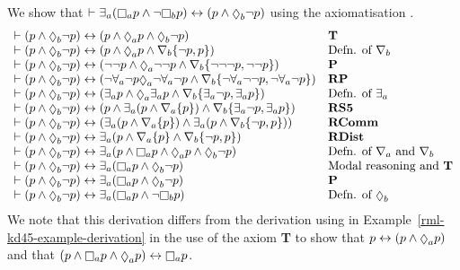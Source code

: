 \begin{example}\label{rml-s5-example-derivation}
We show that $\proves \somerefsA (\necessaryA \atomP \land \lnot \necessaryB \atomP) \iff (\atomP \land \possibleB \lnot \atomP)$ using the axiomatisation \axiomRmlS{}.
$$
\begin{array}{ll}
    \proves (\atomP \land \possibleB \lnot \atomP) \iff (\atomP \land \possibleA \atomP \land \possibleB \lnot \atomP) & {\bf T}\\
    \proves (\atomP \land \possibleB \lnot \atomP) \iff (\atomP \land \possibleA \atomP \land \coversB \{\lnot \atomP, \atomP\}) & \text{Defn. of $\coversB$}\\
    \proves (\atomP \land \possibleB \lnot \atomP) \iff (\lnot \lnot \atomP \land \possibleA \lnot \lnot \atomP \land \coversB \{\lnot \lnot \lnot \atomP, \lnot \lnot \atomP\}) & {\bf P}\\
    \proves (\atomP \land \possibleB \lnot \atomP) \iff (\lnot \allrefsA \lnot \atomP \possibleA \lnot \allrefsA \lnot \atomP \land \coversB \{\lnot \allrefsA \lnot \lnot \atomP, \lnot \allrefsA \lnot \atomP\}) & {\bf RP}\\
    \proves (\atomP \land \possibleB \lnot \atomP) \iff (\somerefsA \atomP \land \possibleA \somerefsA \atomP \land \coversB \{\somerefsA \lnot \atomP, \somerefsA \atomP\}) & \text{Defn. of $\somerefsA$}\\
    \proves (\atomP \land \possibleB \lnot \atomP) \iff (\atomP \land \somerefsA (\atomP \land \coversA \{\atomP\}) \land \coversB \{\somerefsA \lnot \atomP, \somerefsA \atomP\}) & {\bf RS5}\\
    \proves (\atomP \land \possibleB \lnot \atomP) \iff (\somerefsA (\atomP \land \coversA \{\atomP\}) \land \somerefsA (\atomP \land \coversB \{\lnot \atomP, \atomP\})) & {\bf RComm}\\
    \proves (\atomP \land \possibleB \lnot \atomP) \iff \somerefsA (\atomP \land \coversA \{\atomP\} \land \coversB \{\lnot \atomP, \atomP\}) & {\bf RDist}\\
    \proves (\atomP \land \possibleB \lnot \atomP) \iff \somerefsA (\atomP \land \necessaryA \atomP \land \possibleA \atomP \land \possibleB \lnot \atomP) & \text{Defn. of $\coversA$ and $\coversB$}\\
    \proves (\atomP \land \possibleB \lnot \atomP) \iff \somerefsA (\necessaryA \atomP \land \possibleB \lnot \atomP) & \text{Modal reasoning and {\bf T}}\\
    \proves (\atomP \land \possibleB \lnot \atomP) \iff \somerefsA (\necessaryA \atomP \land \possibleB \lnot \atomP) & {\bf P}\\
    \proves (\atomP \land \possibleB \lnot \atomP) \iff \somerefsA (\necessaryA \atomP \land \lnot \necessaryB \atomP) & \text{Defn. of $\possibleB$}
\end{array}
$$
We note that this derivation differs from the derivation using \axiomRmlKD{} in Example~\ref{rml-kd45-example-derivation} in the use of the axiom {\bf T} to show that $\atomP \iff (\atomP \land \possibleA \atomP)$ and that $(\atomP \land \necessaryA \atomP \land \possibleA \atomP) \iff \necessaryA \atomP$.
\end{example}

